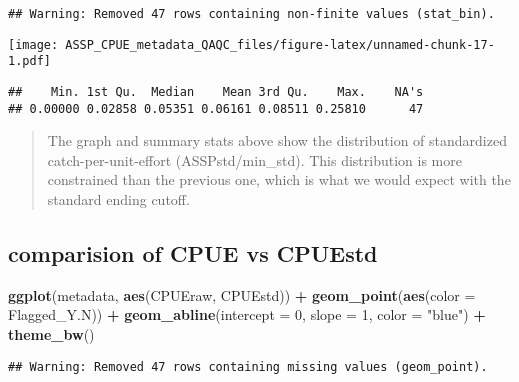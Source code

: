 \documentclass[
]{article}
\newenvironment{Shaded}{\begin{snugshade}}{\end{snugshade}}
\newcommand{\CommentTok}[1]{\textcolor[rgb]{0.56,0.35,0.01}{\textit{#1}}}
\newcommand{\DataTypeTok}[1]{\textcolor[rgb]{0.13,0.29,0.53}{#1}}
\newcommand{\DecValTok}[1]{\textcolor[rgb]{0.00,0.00,0.81}{#1}}
\newcommand{\KeywordTok}[1]{\textcolor[rgb]{0.13,0.29,0.53}{\textbf{#1}}}
\newcommand{\NormalTok}[1]{#1}
\newcommand{\OperatorTok}[1]{\textcolor[rgb]{0.81,0.36,0.00}{\textbf{#1}}}
\newcommand{\StringTok}[1]{\textcolor[rgb]{0.31,0.60,0.02}{#1}}
\begin{document}
\begin{verbatim}
## Warning: Removed 47 rows containing non-finite values (stat_bin).
\end{verbatim}

\texttt{[image: ASSP\_CPUE\_metadata\_QAQC\_files/figure-latex/unnamed-chunk-17-1.pdf]}

\begin{Shaded}
\end{Shaded}

\begin{verbatim}
##    Min. 1st Qu.  Median    Mean 3rd Qu.    Max.    NA's 
## 0.00000 0.02858 0.05351 0.06161 0.08511 0.25810      47
\end{verbatim}

\begin{quote}
The graph and summary stats above show the distribution of standardized
catch-per-unit-effort (ASSPstd/min\_std). This distribution is more
constrained than the previous one, which is what we would expect with
the standard ending cutoff.
\end{quote}

\hypertarget{comparision-of-cpue-vs-cpuestd}{%
\subsection{comparision of CPUE vs
CPUEstd}\label{comparision-of-cpue-vs-cpuestd}}

\begin{Shaded}
\begin{Highlighting}[]
\KeywordTok{ggplot}\NormalTok{(metadata, }\KeywordTok{aes}\NormalTok{(CPUEraw, CPUEstd)) }\OperatorTok{+}
\StringTok{  }\KeywordTok{geom_point}\NormalTok{(}\KeywordTok{aes}\NormalTok{(}\DataTypeTok{color =}\NormalTok{ Flagged_Y.N)) }\OperatorTok{+}
\StringTok{  }\KeywordTok{geom_abline}\NormalTok{(}\DataTypeTok{intercept =} \DecValTok{0}\NormalTok{, }\DataTypeTok{slope =} \DecValTok{1}\NormalTok{, }\DataTypeTok{color =} \StringTok{"blue"}\NormalTok{) }\OperatorTok{+}
\StringTok{  }\KeywordTok{theme_bw}\NormalTok{()}
\end{Highlighting}
\end{Shaded}

\begin{verbatim}
## Warning: Removed 47 rows containing missing values (geom_point).
\end{verbatim}
\end{document}
